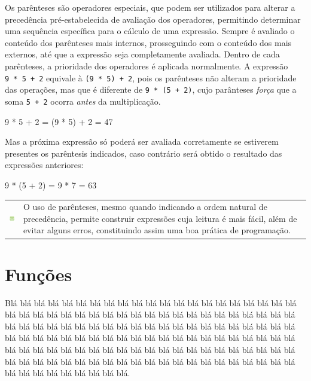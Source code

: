 \documentclass[
]{book}
\begin{document}
Os parênteses são operadores especiais, que podem ser utilizados para alterar a precedência pré-estabelecida de avaliação dos operadores, permitindo determinar uma sequência específica para o cálculo de uma expressão. Sempre é avaliado o conteúdo dos parênteses mais internos, prosseguindo com o conteúdo dos mais externos, até que a expressão seja completamente avaliada. Dentro de cada parênteses, a prioridade dos operadores é aplicada normalmente. A expressão \texttt{9\ *\ 5\ +\ 2} equivale à \texttt{(9\ *\ 5)\ +\ 2}, pois os parênteses não alteram a prioridade das operações, mas que é diferente de \texttt{9\ *\ (5\ +\ 2)}, cujo parânteses \emph{força} que a soma \texttt{5\ +\ 2} ocorra \emph{antes} da multiplicação.

9 * 5 + 2 = (9 * 5) + 2 = 47

Mas a próxima expressão só poderá ser avaliada corretamente se estiverem presentes os parêntesis indicados, caso contrário será obtido o resultado das expressões anteriores:

9 * (5 + 2) = 9 * 7 = 63

\begin{longtable}[]{@{}
  >{\centering\arraybackslash}p{}
  >{\raggedright\arraybackslash}p{}@{}}
\toprule
& \\
\midrule
\endhead
\includegraphics{images/application-green.png} & O uso de parênteses, mesmo quando indicando a ordem natural de precedência, permite construir expressões cuja leitura é mais fácil, além de evitar alguns erros, constituindo assim uma boa prática de programação. \\
\bottomrule
\end{longtable}

\hypertarget{comput-funcao}{%
\section{Funções}\label{comput-funcao}}

Blá blá blá blá blá blá blá blá blá blá blá blá blá blá blá blá blá blá blá blá blá blá blá blá blá blá blá blá blá blá blá blá blá blá blá blá blá blá blá blá blá blá blá blá blá blá blá blá blá blá blá blá blá blá blá blá blá blá blá blá blá blá blá blá blá blá blá blá blá blá blá blá blá blá blá blá blá blá blá blá blá blá blá blá blá blá blá blá blá blá blá blá blá blá blá blá blá blá blá blá blá blá blá blá blá blá blá blá blá blá blá blá blá blá blá blá blá blá blá blá blá blá blá blá blá blá blá blá blá blá blá blá blá blá blá.
\end{document}
